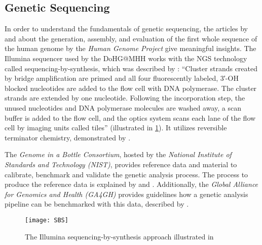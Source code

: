 \subsection{Genetic Sequencing}\label{subsection:literaturegeneticsequencing}
In order to understand the fundamentals of genetic sequencing, the articles by \citeauthor{Lander2001} \autocite{Lander2001} and \citeauthor{Venter2001} \autocite{Venter2001} about the generation, assembly, and evaluation of the first whole sequence of the human genome by the \textit{Human Genome Project} give meaningful insights. The Illumina sequencer used by the \ac{DoHG@MHH} works with the \ac{NGS} technology called sequencing-by-synthesis, which was described \citeyear{Mardis2008a} by \citeauthor{Mardis2008a} \autocite{Mardis2008a}: \enquote{Cluster strands created by bridge amplification are primed and all four fluorescently labeled, 3′-OH blocked nucleotides are added to the flow cell with DNA polymerase. The cluster strands are extended by one nucleotide. Following the incorporation step, the unused nucleotides and DNA polymerase molecules are washed away, a scan buffer is added to the flow cell, and the optics system scans each lane of the flow cell by imaging units called tiles} (illustrated in \cref{figure:SBS}). It utilizes reversible terminator chemistry, demonstrated by \citeauthor{bentley2008} \autocite{bentley2008}.

The \textit{Genome in a Bottle Consortium}, hosted by the \textit{National Institute of Standards and Technology (NIST)}, provides reference data and material to calibrate, benchmark and validate the genetic analysis process. The process to produce the reference data is explained by \citeauthor{Zook2016} \autocites{Zook2016} and \citeauthor{Baid2020} \autocite{Baid2020}. Additionally, the \textit{Global Alliance for Genomics and Health (GA4GH)} provides guidelines how a genetic analysis pipeline can be benchmarked with this data, described by \citeauthor{Krusche2019} \autocite{Krusche2019}.

\begin{figure}[H]
    \centering
    \texttt{[image: SBS]}
    \caption[The Illumina sequencing-by-synthesis approach]{The Illumina sequencing-by-synthesis approach illustrated in \autocite{Mardis2008a}}
    \label{figure:SBS}
\end{figure}

